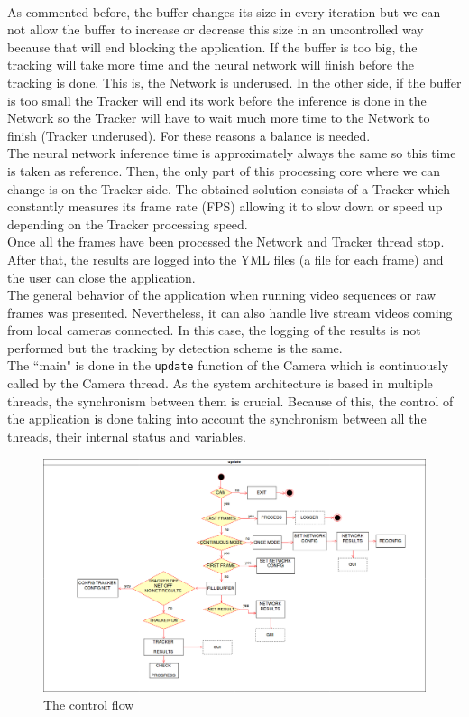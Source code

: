 \\As commented before, the buffer changes its size in every iteration but we can not allow the buffer to increase or decrease this size in an uncontrolled way because that will end blocking the application. If the buffer is too big, the tracking will take more time and the neural network will finish before the tracking is done. This is, the Network is underused. In the other side, if the buffer is too small the Tracker will end its work before the inference is done in the Network so the Tracker will have to wait much more time to the Network to finish (Tracker underused). For these reasons a balance is needed.\\
The neural network inference time is approximately always the same so this time is taken as reference. Then, the only part of this processing core where we can change is on the Tracker side. The obtained solution consists of a Tracker which constantly measures its frame rate (FPS) allowing it to slow down or speed up depending on the Tracker processing speed.\\
Once all the frames have been processed the Network and Tracker thread stop. After that, the results are logged into the YML files (a file for each frame) and the user can close the application.\\
The general behavior of the application when running video sequences or raw frames was presented. Nevertheless, it can also handle live stream videos coming from local cameras connected. In this case, the logging of the results is not performed but the tracking by detection scheme is the same.\\
The ``main" is done in the \texttt{update} function of the Camera which is continuously called by the Camera thread. As the system architecture is based in multiple threads, the synchronism between them is crucial. Because of this, the control of the application is done taking into account the synchronism between all the threads, their internal status and variables.
\begin{figure}[H]
\begin{center}
\includegraphics[scale=0.33]{figures/update_camera.png}
\caption{The control flow}
\label{fig:update_cam}
\end{center}
\end{figure} 

